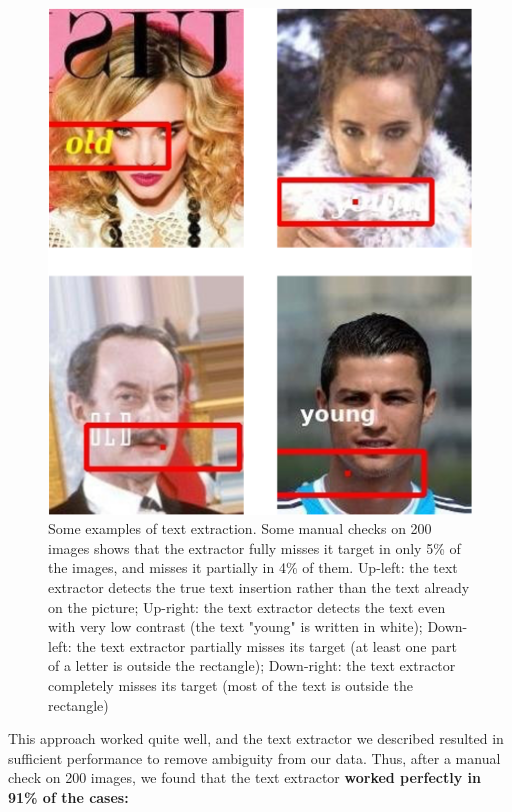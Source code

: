 \documentclass[sigconf, nonacm]{acmart}
\begin{document}
\begin{figure}[!h]
    \centering
    \includegraphics[width=\columnwidth]{figures/result-text-extraction.png}
    \caption{Some examples of text extraction. Some manual checks on 200 images shows that the extractor fully misses it target in only 5\% of the images, and misses it partially in 4\% of them. {\normalfont Up-left: the text extractor detects the true text insertion rather than the text already on the picture; Up-right: the text extractor detects the text even with very low contrast (the text "young" is written in white); Down-left: the text extractor partially misses its target (at least one part of a letter is outside the rectangle); Down-right: the text extractor completely misses its target (most of the text is outside the rectangle)}}
    \label{fig:result_text_extractor}
\end{figure}

This approach worked quite well, and the text extractor we described resulted in sufficient performance to remove ambiguity from our data. Thus, after a manual check on 200 images, we found that the text extractor \textbf{worked perfectly in 91\% of the cases:}
\end{document}
